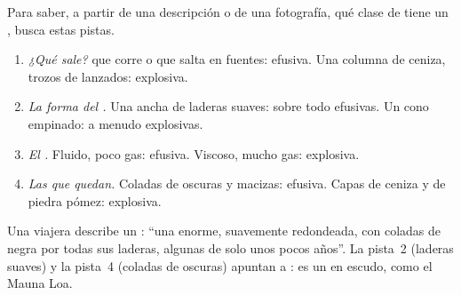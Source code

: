 \begin{method}\label{met:g7:volcanoes:clues}
Para saber, a partir de una descripción o de una fotografía, qué clase de
 tiene un , busca estas pistas.
\begin{enumerate}
  \item \emph{¿Qué sale?}  que corre o que salta en fuentes: efusiva.
        Una columna de ceniza, trozos de  lanzados: explosiva.
  \item \emph{La forma del .} Una  ancha de laderas suaves:
         sobre todo efusivas. Un cono empinado: a menudo
        explosivas.
  \item \emph{El .} Fluido, poco gas: efusiva. Viscoso, mucho gas:
        explosiva.
  \item \emph{Las  que quedan.} Coladas de  oscuras y macizas:
        efusiva. Capas de ceniza y de piedra pómez: explosiva.
\end{enumerate}
\end{method}

\begin{example}\label{ex:g7:volcanoes:clues}
Una viajera describe un : ``una  enorme, suavemente
redondeada, con coladas de  negra por todas sus laderas, algunas de
solo unos pocos años''. La pista~2 (laderas suaves) y la pista~4 (coladas de
 oscuras) apuntan a : es un  en escudo, como el
Mauna Loa.
\end{example}

